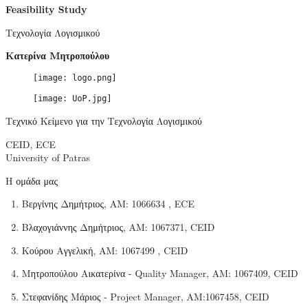 \documentclass{article}
\begin{document}

\begin{titlepage}
   \begin{center}
       \vspace*{1cm}

       \textbf{\huge Feasibility Study}

       \vspace{0.5cm}
        Τεχνολογία Λογισμικού
            
       \vspace{1cm}

       \textbf{Κατερίνα Μητροπούλου}
       
       \begin{figure}[!htb]
        \centering
        \texttt{[image: logo.png]}
        \end{figure}
        
        \vspace{0.5cm}
        
        \begin{figure}[!htb]
        \centering
        \texttt{[image: UoP.jpg]}
        \end{figure}


       \vfill
            
       Τεχνικό Κείμενο για την Τεχνολογία Λογισμικού\\
            
       \vspace{0.5cm}
            
       CEID, ECE\\
       University of Patras\\
            
   \end{center}
\end{titlepage}



\noindent Η ομάδα μας

\begin{enumerate}
  \item Βεργίνης Δημήτριος, ΑΜ: 1066634 , ECE
  \item Βλαχογιάννης Δημήτριος, ΑΜ: 1067371, CEID
  \item Κούρου Αγγελική, ΑΜ: 1067499 , CEID
  \item Μητροπούλου Αικατερίνα - Quality Manager, ΑΜ: 1067409, CEID
  \item Στεφανίδης Μάριος - Project Manager, ΑΜ:1067458, CEID
\end{enumerate}
\end{document}
